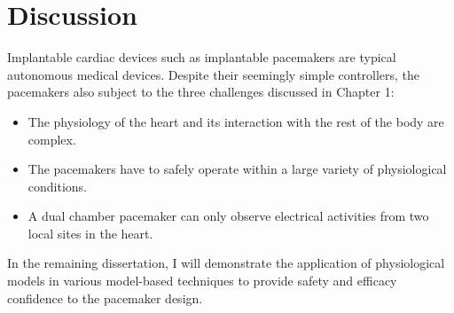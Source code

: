 \section{Discussion}
Implantable cardiac devices such as implantable pacemakers are typical autonomous medical devices.
Despite their seemingly simple controllers, the pacemakers also subject to the three challenges discussed in Chapter 1:
\begin{itemize}
	\item The physiology of the heart and its interaction with the rest of the body are complex.
\item The pacemakers have to safely operate within a large variety of physiological conditions.
\item A dual chamber pacemaker can only observe electrical activities from two local sites in the heart.
\end{itemize}
In the remaining dissertation, I will demonstrate the application of physiological models in various model-based techniques to provide safety and efficacy confidence to the pacemaker design.


